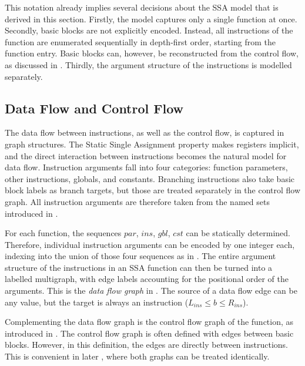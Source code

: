     This notation already implies several decisions about the SSA model that is
    derived in this section.
    Firstly, the model captures only a single function at once.
    Secondly, basic blocks are not explicitly encoded.
    Instead, all instructions of the function are enumerated sequentially in
    depth-first order, starting from the function entry.
    Basic blocks can, however, be reconstructed from the control flow, as
    discussed in .
    Thirdly, the argument structure of the instructions is modelled separately.

\subsection{Data Flow and Control Flow}

    The data flow between instructions, as well as the control flow, is captured
    in graph structures.
    The Static Single Assignment property makes registers implicit, and the
    direct interaction between instructions becomes the natural model for data
    flow.
    Instruction arguments fall into four categories: function parameters,
    other instructions, globals, and constants.
    Branching instructions also take basic block labels as branch targets,
    but those are treated separately in the control flow graph.
    All instruction arguments are therefore taken from the named sets introduced
    in .

    For each function, the sequences $par$, $ins$, $gbl$, $cst$ can be
    statically determined.
    Therefore, individual instruction arguments can be encoded by one integer
    each, indexing into the union of those four sequences as in
    .
    The entire argument structure of the instructions in an SSA
    function can then be turned into a labelled multigraph, with edge labels
    accounting for the positional order of the arguments.
    This is the {\it data flow graph} in .
    The source of a data flow edge can be any value, but the target is
    always an instruction ($L_{ins}\leq b\leq R_{ins}$).

    Complementing the data flow graph is the control flow graph of the function,
    as introduced in .
    The control flow graph is often defined with edges between basic blocks.
    However, in this definition, the edges are directly between instructions.
    This is convenient in later
    , where both graphs
    can be treated identically.

